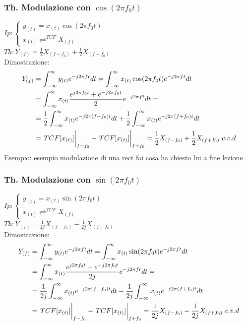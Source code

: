         \subsubsection{Th. Modulazione con $\cos(2\pi f_0t)$}\label{Modulazione con coseno}
            $Ip:\begin{cases}
                    y_{(t)}= x_{(t)}\cos(2\pi f_0t)\\        
                    x_{(t)}\rightleftharpoons^{TCF} X_{(f)}
                \end{cases}$\\
            $Th: Y_{(f)} = \frac{1}{2} X_{(f-f_0)} + \frac{1}{2} X_{(f+f_0)}$ \\
            Dimostrazione:
            \begin{align}
                Y_{(f)} & = \int_{-\infty}^{\infty} y_{(t)} e^{-j2\pi ft} dt = \int_{-\infty}^{\infty} x_{(t)}\cos(2\pi f_0t) e^{-j2\pi ft} dt \nonumber \\
                & =\int_{-\infty}^{\infty} x_{(t)} \frac{e^{j2\pi f_0t} + e^{-j2\pi f_0t}}{2} e^{-j2\pi ft} dt =  \nonumber \\
                & = \frac{1}{2} \int_{-\infty}^{\infty} x_{(t)} e^{-j2\pi (f-f_0)t} dt + \frac{1}{2} \int_{-\infty}^{\infty} x_{(t)} e^{-j2\pi (f+f_0)t} dt \nonumber \\
                & = \eval{TCF[x_{(t)}]}_{f-f_0} + \eval{TCF[x_{(t)}]}_{f+f_0} = \frac{1}{2} X_{(f-f_0)} + \frac{1}{2} X_{(f+f_0)}\ c.v.d \nonumber  
            \end{align}
            Esempio:
            {
                esempio modulazione di una rect
            }
            fai cosa ha chiesto lui a fine lezione
        \subsubsection{Th. Modulazione con $\sin(2\pi f_0t)$}\label{Modulazione con seno}
        $Ip:\begin{cases}
                y_{(t)}= x_{(t)}\sin(2\pi f_0t)\\        
                x_{(t)}\rightleftharpoons^{TCF} X_{(f)}
            \end{cases}$\\
        $Th: Y_{(f)} = \frac{1}{2j} X_{(f-f_0)} - \frac{1}{2j} X_{(f+f_0)} $ \\
        Dimostrazione: 
        \begin{align}
            Y_{(f)} & = \int_{-\infty}^{\infty} y_{(t)} e^{-j2\pi ft} dt = \int_{-\infty}^{\infty} x_{(t)}\sin(2\pi f_0t) e^{-j2\pi ft} dt \nonumber \\
            & =\int_{-\infty}^{\infty} x_{(t)} \frac{e^{j2\pi f_0t} - e^{-j2\pi f_0t}}{2j} e^{-j2\pi ft} dt =  \nonumber \\
            & = \frac{1}{2j} \int_{-\infty}^{\infty} x_{(t)} e^{-j2\pi (f-f_0)t} dt - \frac{1}{2j} \int_{-\infty}^{\infty} x_{(t)} e^{-j2\pi (f+f_0)t} dt \nonumber \\
            & = \eval{TCF[x_{(t)}]}_{f-f_0} - \eval{TCF[x_{(t)}]}_{f+f_0} = \frac{1}{2j} X_{(f-f_0)} - \frac{1}{2j} X_{(f+f_0)}\ c.v.d \nonumber  
        \end{align}

